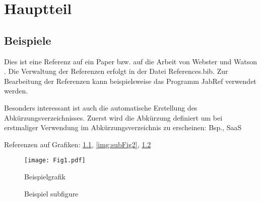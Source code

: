 
\chapter{Hauptteil}
\label{chap:Hauptteil}


\section{Beispiele}
Dies  ist eine Referenz auf ein Paper \cite{Webster2002} bzw. auf die Arbeit von Webster und Watson \cite{Webster2002}. Die Verwaltung der Referenzen erfolgt in der Datei References.bib. Zur Bearbeitung der Referenzen kann beispielsweise das Programm JabRef verwendet werden.

Besonders interessant ist auch die automatische Erstellung des Abkürzungsverzeichnisses. Zuerst wird die Abkürzung definiert um bei erstmaliger Verwendung im Abkürzungsverzeichnis zu erscheinen: \ac{Bsp.}, \ac{SaaS}

Referenzen auf Grafiken: \ref{fig:Fig1}, \ref{img:subFig2}, \ref{img:subFigs}

\begin{figure}
  \centering
  \texttt{[image: Fig1.pdf]}
  \caption{Beispielgrafik}
  \label{fig:Fig1}
\end{figure}


\begin{figure}
  \centering
  \hfill
  \hfill
  \caption{Beispiel subfigure}
  \label{img:subFigs}
\end{figure}



\lstset{language=JAVA, breaklines=true, tabsize=2}



